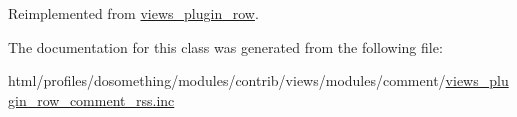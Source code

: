 Reimplemented from \hyperlink{classviews__plugin__row_a8243842e087dd28664b32cef0309f2a6}{views\_\-plugin\_\-row}.

The documentation for this class was generated from the following file:\begin{DoxyCompactItemize}
\item 
html/profiles/dosomething/modules/contrib/views/modules/comment/\hyperlink{views__plugin__row__comment__rss_8inc}{views\_\-plugin\_\-row\_\-comment\_\-rss.inc}\end{DoxyCompactItemize}
